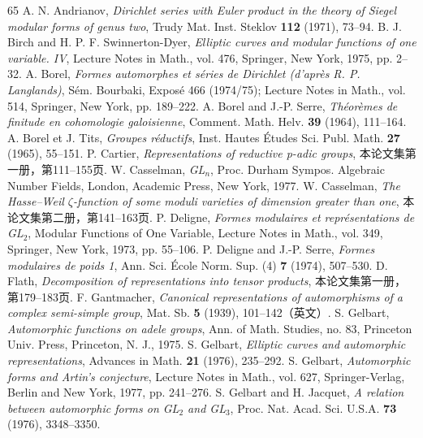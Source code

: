 \begin{thebibliography}{65}
\setlength{\itemsep}{3pt}
 A. N. Andrianov, \emph{Dirichlet series with Euler product in the theory of Siegel modular forms of genus two}, Trudy Mat. Inst. Steklov \textbf{112} (1971), 73--94.
 B. J. Birch and H. P. F. Swinnerton-Dyer, \emph{Elliptic curves and modular functions of one variable. IV}, Lecture Notes in Math., vol. 476, Springer, New York, 1975, pp. 2--32.
 A. Borel, \emph{Formes automorphes et séries de Dirichlet (d'après R. P. Langlands)}, Sém. Bourbaki, Exposé 466 (1974/75); Lecture Notes in Math., vol. 514, Springer, New York, pp. 189--222.
 A. Borel and J.-P. Serre, \emph{Théorèmes de finitude en cohomologie galoisienne}, Comment. Math. Helv. \textbf{39} (1964), 111--164.
 A. Borel et J. Tits, \emph{Groupes réductifs}, Inst. Hautes Études Sci. Publ. Math. \textbf{27} (1965), 55--151.
 P. Cartier, \emph{Representations of reductive p-adic groups}, 本论文集第一册，第111--155页.
 W. Casselman, \emph{GL$_n$}, Proc. Durham Sympos. Algebraic Number Fields, London, Academic Press, New York, 1977.
 W. Casselman, \emph{The Hasse--Weil $\zeta$-function of some moduli varieties of dimension greater than one}, 本论文集第二册，第141--163页.
 P. Deligne, \emph{Formes modulaires et représentations de GL$_2$}, Modular Functions of One Variable, Lecture Notes in Math., vol. 349, Springer, New York, 1973, pp. 55--106.
 P. Deligne and J.-P. Serre, \emph{Formes modulaires de poids 1}, Ann. Sci. École Norm. Sup. (4) \textbf{7} (1974), 507--530.
 D. Flath, \emph{Decomposition of representations into tensor products}, 本论文集第一册，第179--183页.
 F. Gantmacher, \emph{Canonical representations of automorphisms of a complex semi-simple group}, Mat. Sb. \textbf{5} (1939), 101--142（英文）.
 S. Gelbart, \emph{Automorphic functions on adele groups}, Ann. of Math. Studies, no. 83, Princeton Univ. Press, Princeton, N. J., 1975.
 S. Gelbart, \emph{Elliptic curves and automorphic representations}, Advances in Math. \textbf{21} (1976), 235--292.
 S. Gelbart, \emph{Automorphic forms and Artin's conjecture}, Lecture Notes in Math., vol. 627, Springer-Verlag, Berlin and New York, 1977, pp. 241--276.
 S. Gelbart and H. Jacquet, \emph{A relation between automorphic forms on GL$_2$ and GL$_3$}, Proc. Nat. Acad. Sci. U.S.A. \textbf{73} (1976), 3348--3350.

\end{thebibliography}
